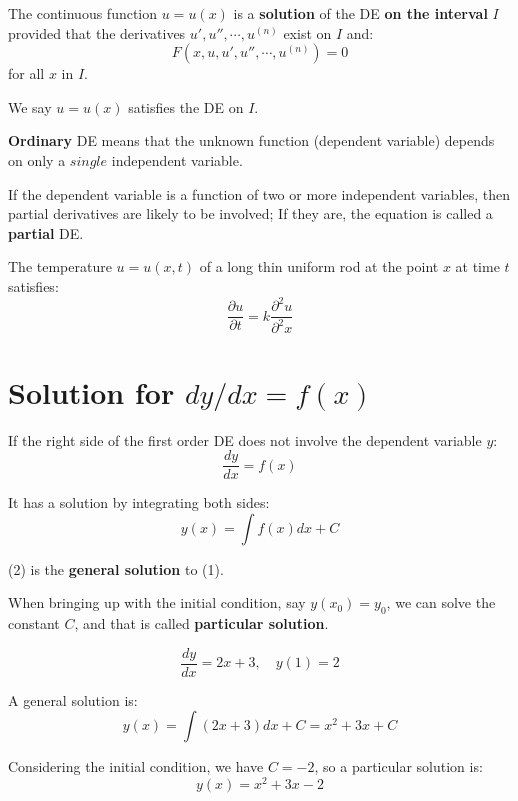 \begin{definition}[solution]
    The continuous function \(u = u(x)\) is a \textbf{solution} of the DE \textbf{on the interval} \(I\) 
    provided that the derivatives \(u', u'', \cdots, u^{(n)}\) exist on \(I\) and:
    \[
        F(x, u, u', u'', \cdots, u^{(n)}) = 0
    \]   
    for all \(x\) in \(I\).  

    We say \(u = u(x)\) satisfies the DE on \(I\).  
\end{definition}

\begin{definition}
    \textbf{Ordinary} DE means that the unknown function (dependent variable) depends on only a \(single\) independent variable. 

    If the dependent variable is a function of two or more independent variables, then partial derivatives are likely to be involved;
    If they are, the equation is called a \textbf{partial} DE.

    \begin{example}
       The temperature \(u = u(x, t)\) of a long thin uniform rod at the point \(x\) at time \(t\) satisfies:
       \[
       \frac{\partial u}{\partial t} = k \frac{\partial^2 u}{\partial^2 x}  
       \]  
    \end{example}
\end{definition}


\section{Solution for \(dy/dx = f(x)\)}

If the right side of the first order DE does not involve the dependent variable \(y\): 
\[
   \dfrac{dy}{dx} = f(x)  \tag{1}
\]

It has a solution by integrating both sides:
\[
    y(x) = \int f(x) dx + C \tag{2}
\]

(2) is the \textbf{general solution} to (1). 

When bringing up with the initial condition, say \(y(x_0) = y_0\), we can solve the constant \(C\),
and that is called \textbf{particular solution}.  

\begin{example}
    \[
        \dfrac{dy}{dx} = 2x + 3, \quad y(1) = 2
    \]

    A general solution is:
    \[
        y(x) = \int (2x+3) dx + C = x^2 + 3x + C
    \]

    Considering the initial condition, we have \(C = -2\), so a particular solution is:
    \[
        y(x) = x^2 + 3x -2
    \] 
\end{example}

